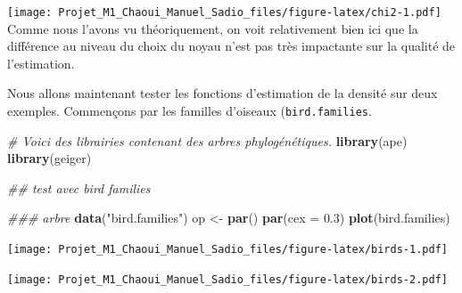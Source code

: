 \documentclass[
]{book}
\newenvironment{Shaded}{\begin{snugshade}}{\end{snugshade}}
\newcommand{\CommentTok}[1]{\textcolor[rgb]{0.56,0.35,0.01}{\textit{#1}}}
\newcommand{\DataTypeTok}[1]{\textcolor[rgb]{0.13,0.29,0.53}{#1}}
\newcommand{\DecValTok}[1]{\textcolor[rgb]{0.00,0.00,0.81}{#1}}
\newcommand{\FloatTok}[1]{\textcolor[rgb]{0.00,0.00,0.81}{#1}}
\newcommand{\KeywordTok}[1]{\textcolor[rgb]{0.13,0.29,0.53}{\textbf{#1}}}
\newcommand{\NormalTok}[1]{#1}
\newcommand{\OperatorTok}[1]{\textcolor[rgb]{0.81,0.36,0.00}{\textbf{#1}}}
\newcommand{\StringTok}[1]{\textcolor[rgb]{0.31,0.60,0.02}{#1}}
\begin{document}
\texttt{[image: Projet\_M1\_Chaoui\_Manuel\_Sadio\_files/figure-latex/chi2-1.pdf]}
Comme nous l'avons vu théoriquement, on voit relativement bien ici que la différence au niveau du choix du noyau n'est pas très impactante sur la qualité de l'estimation.

Nous allons maintenant tester les fonctions d'estimation de la densité sur deux exemples.
Commençons par les familles d'oiseaux (\texttt{bird.families}.

\begin{Shaded}
\begin{Highlighting}[]
\CommentTok{# Voici des librairies contenant des arbres phylogénétiques.}
\KeywordTok{library}\NormalTok{(ape)}
\KeywordTok{library}\NormalTok{(geiger)}

\CommentTok{## test avec bird families}

\CommentTok{### arbre}
\KeywordTok{data}\NormalTok{(}\StringTok{"bird.families"}\NormalTok{)}
\NormalTok{op <-}\StringTok{ }\KeywordTok{par}\NormalTok{()}
\KeywordTok{par}\NormalTok{(}\DataTypeTok{cex =} \FloatTok{0.3}\NormalTok{)}
\KeywordTok{plot}\NormalTok{(bird.families)}
\end{Highlighting}
\end{Shaded}

\texttt{[image: Projet\_M1\_Chaoui\_Manuel\_Sadio\_files/figure-latex/birds-1.pdf]}

\begin{Shaded}
\end{Shaded}

\texttt{[image: Projet\_M1\_Chaoui\_Manuel\_Sadio\_files/figure-latex/birds-2.pdf]}
\end{document}
